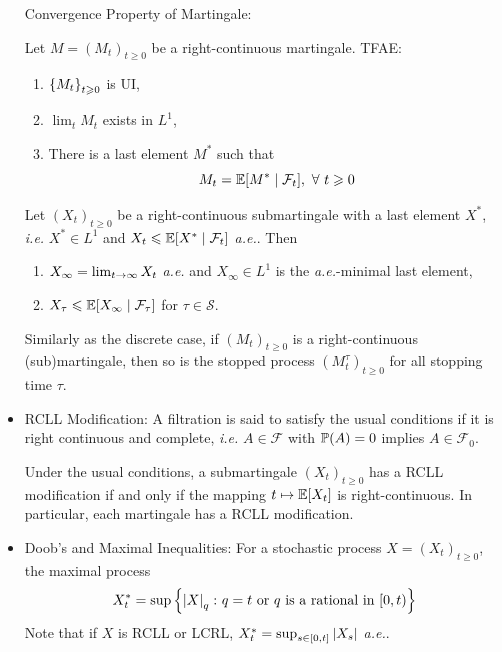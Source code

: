 \documentclass[a4paper,12pt]{article}
\begin{document}
\begin{itemize}
  \noindent Convergence Property of Martingale:
  \begin{thm}
    Let $M = (M_t)_{t\geqslant 0}$ be a right-continuous martingale. TFAE:
    \begin{enumerate}[label=(\arabic*)]
      \item $\left\{M_t\right\}_{t\geqslant 0}$ is UI,
      \item $\lim_t M_t$ exists in $L^1$,
      \item There is a last element $M^*$ such that
      \begin{equation*}
        M_t = \mathbb{E}[M^* \mid \mathcal{F}_t],~\forall~t \geqslant 0
      \end{equation*}
    \end{enumerate}
  \end{thm}

  \begin{thm}
    Let $(X_t)_{t\geqslant 0}$ be a right-continuous submartingale with a last element $X^*$, \emph{i.e.} $X^* \in L^1$ and $X_t \leqslant \mathbb{E}[X^* \mid \mathcal{F}_t]$ \emph{a.e.}. Then
    \begin{enumerate}[label=(\arabic*)]
      \item $X_{\infty} = \lim_{t\rightarrow \infty} X_t$ \emph{a.e.} and $X_{\infty} \in L^1$ is the \emph{a.e.}-minimal last element,
      \item $X_{\tau} \leqslant \mathbb{E}[X_{\infty} \mid \mathcal{F}_{\tau}]$ for $\tau \in \mathcal{S}$.
    \end{enumerate}
  \end{thm}

  \noindent Similarly as the discrete case, if $(M_t)_{t\geqslant 0}$ is a right-continuous (sub)martingale, then so is the stopped process $(M^{\tau}_t)_{t\geqslant 0}$ for all stopping time $\tau$.

  \item RCLL Modification: A filtration is said to satisfy the usual conditions if it is right continuous and complete, \emph{i.e.} $A \in \mathcal{F}$ with $\mathbb{P}(A) = 0$ implies $A \in \mathcal{F}_0$.

  \begin{thm}
    Under the usual conditions, a submartingale $(X_t)_{t\geqslant 0}$ has a RCLL modification if and only if the mapping $t \mapsto \mathbb{E}[X_t]$ is right-continuous. In particular, each martingale has a RCLL modification.
  \end{thm}

  \item Doob’s and Maximal Inequalities: For a stochastic process $X=(X_t)_{t\geqslant 0}$, the maximal process
  \begin{equation*}
    X^*_t = \sup\left\{\left\lvert X\right\lvert_q \colon q=t \text{ or }q\text{ is a rational in }[0,t)\right\}
  \end{equation*}
  Note that if $X$ is RCLL or LCRL, $X^*_t = \sup_{s \in [0,t]}\left\lvert X_s\right\lvert$ \emph{a.e.}.


\end{itemize}
\end{document}
